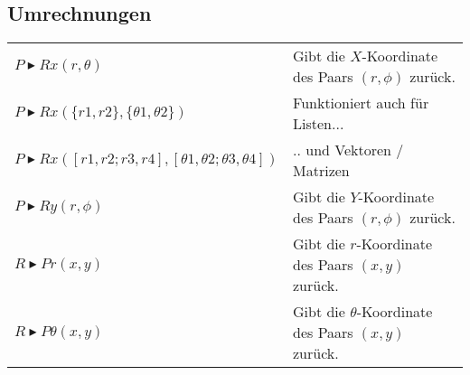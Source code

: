\subsection{Umrechnungen}
\begin{tabular}{|l|l|}
	\hline
	$P \blacktriangleright Rx(r,\theta)$						& Gibt die $X$-Koordinate des Paars $(r,\phi)$ zurück.		\\ 
	$P \blacktriangleright Rx(\{r1,r2\},\{\theta 1,\theta 2\})$	& Funktioniert auch für Listen...							\\ 
	$P \blacktriangleright Rx([r1,r2;r3,r4],[\theta 1,\theta 2; \theta 3, \theta 4 ]) $
																& .. und Vektoren / Matrizen								\\ \hline
	$P \blacktriangleright Ry(r,\phi)$							& Gibt die $Y$-Koordinate des Paars $(r,\phi)$ zurück.		\\ \hline
	$R \blacktriangleright Pr(x,y) $							& Gibt die $r$-Koordinate des Paars $(x,y)$ zurück.			\\ \hline
	$R \blacktriangleright P \theta(x,y)$						& Gibt die $\theta$-Koordinate des Paars $(x,y)$ zurück.	\\ \hline
\end{tabular}